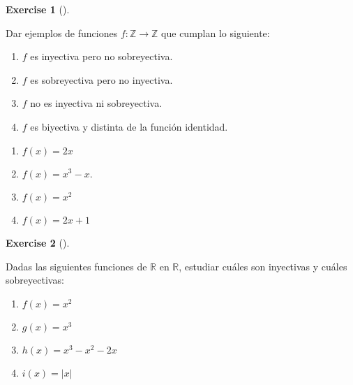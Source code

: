 \documentclass[
  letterpaper,
  DIV=11,
  numbers=noendperiod]{scrreport}
\providecommand{\tightlist}{%
  \setlength{\itemsep}{0pt}\setlength{\parskip}{0pt}}\usepackage{longtable,booktabs,array}
\theoremstyle{definition}
\newtheorem{exercise}{Exercise}[chapter]
\theoremstyle{remark}
\begin{document}
\leavevmode{}%
\begin{exercise}[]\label{exr-8}

Dar ejemplos de funciones \(f:\mathbb{Z}\rightarrow \mathbb{Z}\) que
cumplan lo siguiente:

\begin{enumerate}
\def\labelenumi{\alph{enumi}.}
\tightlist
\item
  \(f\) es inyectiva pero no sobreyectiva.
\item
  \(f\) es sobreyectiva pero no inyectiva.
\item
  \(f\) no es inyectiva ni sobreyectiva.
\item
  \(f\) es biyectiva y distinta de la función identidad.
\end{enumerate}

\end{exercise}

\begin{tcolorbox}[enhanced jigsaw, bottomtitle=1mm, opacityback=0, coltitle=black, toprule=.15mm, colback=white, titlerule=0mm, rightrule=.15mm, title=\textcolor{quarto-callout-tip-color}{\faLightbulb}\hspace{0.5em}{Solución}, breakable, bottomrule=.15mm, colbacktitle=quarto-callout-tip-color!10!white, toptitle=1mm, opacitybacktitle=0.6, left=2mm, leftrule=.75mm, colframe=quarto-callout-tip-color-frame, arc=.35mm]

\begin{enumerate}
\def\labelenumi{\alph{enumi}.}
\tightlist
\item
  \(f(x)=2x\)
\item
  \(f(x)=x^3-x\).
\item
  \(f(x)=x^2\)
\item
  \(f(x)=2x+1\)
\end{enumerate}

\end{tcolorbox}

\leavevmode{}%
\begin{exercise}[]\label{exr-9}

Dadas las siguientes funciones de \(\mathbb{R}\) en \(\mathbb{R}\),
estudiar cuáles son inyectivas y cuáles sobreyectivas:

\begin{enumerate}
\def\labelenumi{\alph{enumi}.}
\tightlist
\item
  \(f(x)=x^2\)
\item
  \(g(x)=x^3\)
\item
  \(h(x)=x^3-x^2-2x\)
\item
  \(i(x)=|x|\)
\end{enumerate}

\end{exercise}
\end{document}
